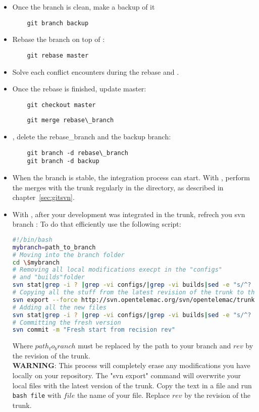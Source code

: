 \begin{itemize}
\item Once the branch is clean, make a backup of it
  \begin{lstlisting}
    git branch backup
  \end{lstlisting}
\item Rebase the branch  on top of :
  \begin{lstlisting}
    git rebase master
  \end{lstlisting}
\item Solve each conflict  encounters during the rebase and .
\item Once the rebase is finished, update master:
  \begin{lstlisting}
    git checkout master
  \end{lstlisting}
  \begin{lstlisting}
    git merge rebase\_branch
  \end{lstlisting}
\item {}, delete the rebase\_branch and the backup branch:
  \begin{lstlisting}
    git branch -d rebase\_branch
    git branch -d backup
  \end{lstlisting}
\item When the branch  is stable, the integration process can start. With , perform the merges with the trunk regularly in the  directory, as described in chapter~\ref{sec:gitsvn}.
\item With , after your development was integrated in the trunk, refrech you svn branch :
To do that efficiently use the following script:
\begin{lstlisting}[language=bash]
#!/bin/bash
mybranch=path_to_branch
# Moving into the branch folder
cd \$mybranch
# Removing all local modifications execpt in the "configs"
# and "builds"folder
svn stat|grep -i ? |grep -vi configs/|grep -vi builds|sed -e "s/^?      //g"|tr '\n' ' '|xargs rm -rvf
# Copying all the stuff from the latest revision of the trunk to the branch
svn export --force http://svn.opentelemac.org/svn/opentelemac/trunk .
# Adding all the new files
svn stat|grep -i ? |grep -vi configs/|grep -vi builds|sed -e "s/^?      //g"|tr '\n' ' '|xargs svn add
# Committing the fresh version
svn commit -m "Fresh start from recision rev"
\end{lstlisting}
Where $path_to_branch$ must be replaced by the path to your branch and $rev$ by
the revision of the trunk.
%
\\
\textbf{WARNING}:
This process will completely erase any modifications you have locally on your
repository.  The "svn export" command will overwrite your local files with the
latest version of the trunk.
%
Copy the text in a file and run \verb!bash file! with $file$ the name of your
file. Replace $rev$ by the revision of the trunk.
\end{itemize}

